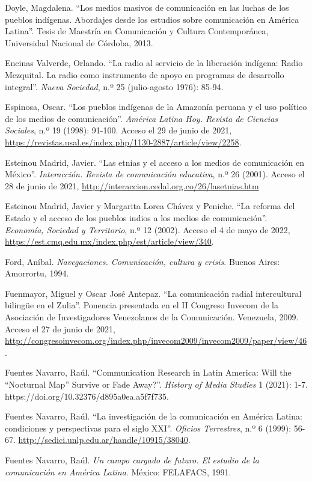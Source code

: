 \documentclass{tufte-handout}
\begin{document}
\begin{hangparas}{.25in}{1}
Doyle, Magdalena. ``Los medios masivos de comunicación en las luchas de
los pueblos indígenas. Abordajes desde los estudios sobre comunicación
en América Latina''. Tesis de Maestría en Comunicación y Cultura
Contemporánea, Universidad Nacional de Córdoba, 2013.

Encinas Valverde, Orlando. ``La radio al servicio de la liberación
indígena: Radio Mezquital. La radio como instrumento de apoyo en
programas de desarrollo integral''. \emph{Nueva Sociedad}, n.º 25
(julio-agosto 1976): 85-94.

Espinosa, Oscar. ``Los pueblos indígenas de la Amazonía peruana y el uso
político de los medios de comunicación''. \emph{América Latina Hoy.
Revista de Ciencias Sociales}, n.º 19 (1998): 91-100. Acceso el 29 de
junio de 2021,
\url{https://revistas.usal.es/index.php/1130-2887/article/view/2258}.

Esteinou Madrid, Javier. ``Las etnias y el acceso a los medios de
comunicación en México''. \emph{Interacción. Revista de comunicación
educativa}, n.º 26 (2001). Acceso el 28 de junio de 2021,
\url{http://interaccion.cedal.org.co/26/lasetnias.htm}

Esteinou Madrid, Javier y Margarita Lorea Chávez y Peniche. ``La reforma
del Estado y el acceso de los pueblos indios a los medios de
comunicación''. \emph{Economía, Sociedad y Territorio}, n.º 12 (2002).
Acceso el 4 de mayo de 2022, \url{https://est.cmq.edu.mx/index.php/est/article/view/340}.

Ford, Aníbal. \emph{Navegaciones. Comunicación, cultura y crisis}.
Buenos Aires: Amorrortu, 1994.

Fuenmayor, Miguel y Oscar José Antepaz. ``La comunicación radial
intercultural bilingüe en el Zulia''. Ponencia presentada en el II
Congreso Invecom de la Asociación de Investigadores Venezolanos de la
Comunicación. Venezuela, 2009. Acceso el 27 de junio de 2021,
\url{http://congresoinvecom.org/index.php/invecom2009/invecom2009/paper/view/46}.

Fuentes Navarro, Raúl. ``Communication Research in Latin America: Will
the ``Nocturnal Map'' Survive or Fade Away?''. \emph{History of Media
Studies} 1 (2021): 1-7. https://doi.org/10.32376/d895a0ea.a5f7f735.

Fuentes Navarro, Raúl. ``La investigación de la comunicación en América
Latina: condiciones y perspectivas para el siglo XXI''. \emph{Oficios
Terrestres}, n.º 6 (1999): 56-67.
\url{http://sedici.unlp.edu.ar/handle/10915/38040}.

Fuentes Navarro, Raúl. \emph{Un campo cargado de futuro. El estudio de
la comunicación en América Latina}. México: FELAFACS, 1991.


\end{hangparas}
\end{document}
